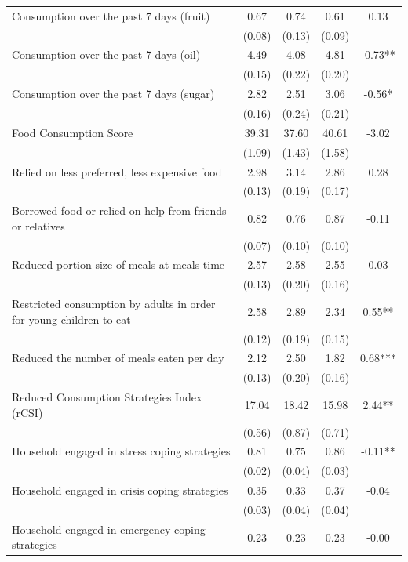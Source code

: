 \begin{tabular}{@{\extracolsep{5pt}}lcccc}
Consumption over the past 7 days (fruit)   & 0.67    & 0.74    & 0.61    & 0.13   \\
 & (0.08)  & (0.13)  & (0.09)  &  \\ [1ex]
Consumption over the past 7 days (oil)   & 4.49    & 4.08    & 4.81    & -0.73**   \\
 & (0.15)  & (0.22)  & (0.20)  &  \\ [1ex]
Consumption over the past 7 days (sugar)   & 2.82    & 2.51    & 3.06    & -0.56*   \\
 & (0.16)  & (0.24)  & (0.21)  &  \\ [1ex]
Food Consumption Score   & 39.31    & 37.60    & 40.61    & -3.02   \\
 & (1.09)  & (1.43)  & (1.58)  &  \\ [1ex]
Relied on less preferred, less expensive food   & 2.98    & 3.14    & 2.86    & 0.28   \\
 & (0.13)  & (0.19)  & (0.17)  &  \\ [1ex]
Borrowed food or relied on help from friends or relatives   & 0.82    & 0.76    & 0.87    & -0.11   \\
 & (0.07)  & (0.10)  & (0.10)  &  \\ [1ex]
Reduced portion size of meals at meals time   & 2.57    & 2.58    & 2.55    & 0.03   \\
 & (0.13)  & (0.20)  & (0.16)  &  \\ [1ex]
Restricted consumption by adults in order for young-children to eat   & 2.58    & 2.89    & 2.34    & 0.55**   \\
 & (0.12)  & (0.19)  & (0.15)  &  \\ [1ex]
Reduced the number of meals eaten per day   & 2.12    & 2.50    & 1.82    & 0.68***   \\
 & (0.13)  & (0.20)  & (0.16)  &  \\ [1ex]
Reduced Consumption Strategies Index (rCSI)   & 17.04    & 18.42    & 15.98    & 2.44**   \\
 & (0.56)  & (0.87)  & (0.71)  &  \\ [1ex]
Household engaged in stress coping strategies   & 0.81    & 0.75    & 0.86    & -0.11**   \\
 & (0.02)  & (0.04)  & (0.03)  &  \\ [1ex]
Household engaged in crisis coping strategies   & 0.35    & 0.33    & 0.37    & -0.04   \\
 & (0.03)  & (0.04)  & (0.04)  &  \\ [1ex]
Household engaged in emergency coping strategies   & 0.23    & 0.23    & 0.23    & -0.00   \\

\end{tabular}
